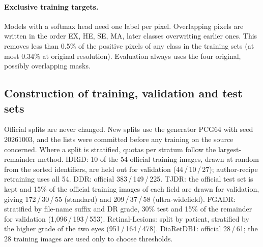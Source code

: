\paragraph{Exclusive training targets.} Models with a softmax head need one label per pixel. Overlapping pixels are written in the order EX, HE, SE, MA, later classes overwriting earlier ones. This removes less than 0.5\% of the positive pixels of any class in the training sets (at most 0.34\% at original resolution). Evaluation always uses the four original, possibly overlapping masks.

\subsection{Construction of training, validation and test sets}
Official splits are never changed. New splits use the generator PCG64 with seed 20261003, and the lists were committed before any training on the source concerned. Where a split is stratified, quotas per stratum follow the largest-remainder method. IDRiD: 10 of the 54 official training images, drawn at random from the sorted identifiers, are held out for validation (44\,/\,10\,/\,27); author-recipe retraining uses all 54. DDR: official 383\,/\,149\,/\,225. TJDR: the official test set is kept and 15\% of the official training images of each field are drawn for validation, giving 172\,/\,30\,/\,55 (standard) and 209\,/\,37\,/\,58 (ultra-widefield). FGADR: stratified by file-name suffix and DR grade, 30\% test and 15\% of the remainder for validation (1,096\,/\,193\,/\,553). Retinal-Lesions: split by patient, stratified by the higher grade of the two eyes (951\,/\,164\,/\,478). DiaRetDB1: official 28\,/\,61; the 28 training images are used only to choose thresholds.

